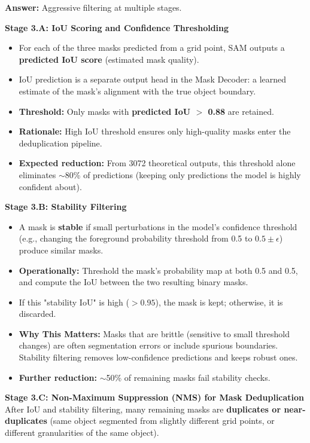 \textbf{Answer:} Aggressive filtering at multiple stages.

\textbf{Stage 3.A: IoU Scoring and Confidence Thresholding}
\begin{itemize}
    \item For each of the three masks predicted from a grid point, SAM outputs a \textbf{predicted IoU score} (estimated mask quality).
    \item IoU prediction is a separate output head in the Mask Decoder: a learned estimate of the mask's alignment with the true object boundary.
    \item \textbf{Threshold:} Only masks with \textbf{predicted IoU $>$ 0.88} are retained.
    \item \textbf{Rationale:} High IoU threshold ensures only high-quality masks enter the deduplication pipeline.
    \item \textbf{Expected reduction:} From 3072 theoretical outputs, this threshold alone eliminates $\sim$80\% of predictions (keeping only predictions the model is highly confident about).
\end{itemize}

\textbf{Stage 3.B: Stability Filtering}
\begin{itemize}
    \item A mask is \textbf{stable} if small perturbations in the model's confidence threshold (e.g., changing the foreground probability threshold from 0.5 to $0.5 \pm \epsilon$) produce similar masks.
    \item \textbf{Operationally:} Threshold the mask's probability map at both 0.5 and 0.5, and compute the IoU between the two resulting binary masks.
    \item If this "stability IoU" is high ($> 0.95$), the mask is kept; otherwise, it is discarded.
    \item \textbf{Why This Matters:} Masks that are brittle (sensitive to small threshold changes) are often segmentation errors or include spurious boundaries. Stability filtering removes low-confidence predictions and keeps robust ones.
    \item \textbf{Further reduction:} $\sim$50\% of remaining masks fail stability checks.
\end{itemize}

\textbf{Stage 3.C: Non-Maximum Suppression (NMS) for Mask Deduplication}
After IoU and stability filtering, many remaining masks are \textbf{duplicates or near-duplicates} (same object segmented from slightly different grid points, or different granularities of the same object).

